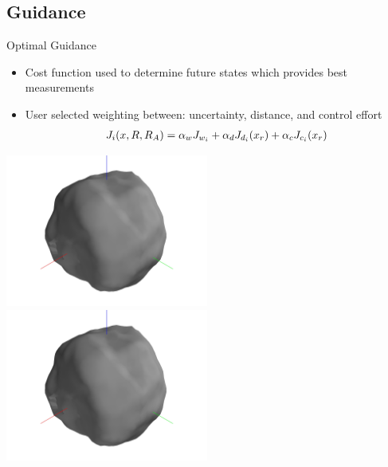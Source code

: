 \subsection{Guidance}
\begin{frame}{Optimal Guidance}
    \begin{itemize}
        \item Cost function used to determine future states which provides best measurements
        \item User selected weighting between: uncertainty, distance, and control effort
            \begin{align*}
                J_i (x, R, R_A) = \alpha_w J_{w_i} + \alpha_d J_{d_i}(x_r) + \alpha_c J_{c_i}(x_r)
            \end{align*}
    \end{itemize}
\begin{center}
        \href{https://youtu.be/ZJY9nPXhyxw}{\includegraphics[trim={20cm 10cm 20cm 10cm},clip,keepaspectratio,width=0.5\textwidth,height=0.5\textheight]{figures/computational_geometry/dynamic_exploration/52760/partial_14998.jpg}}%
        \href{https://youtu.be/VF8dp8D5nVA}{\includegraphics[trim={20cm 10cm 20cm 10cm},clip,keepaspectratio,width=0.5\textwidth,height=0.5\textheight]{figures/computational_geometry/dynamic_exploration/52760/partial_14998.jpg}}
\end{center}
\end{frame}

